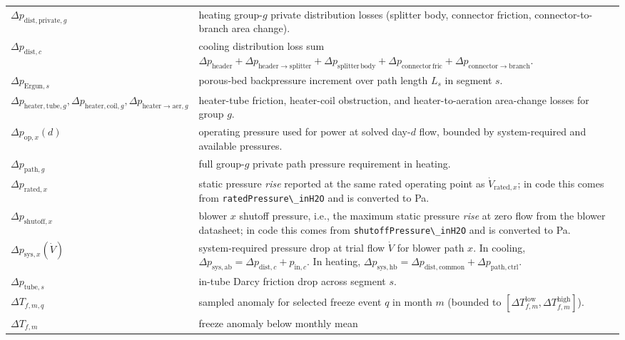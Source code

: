 {\begin{longtable}[]{@{}
  >{\raggedright\arraybackslash}p{}
  >{\raggedright\arraybackslash}p{}@{}}
\(\Delta p_{\mathrm{dist,private},g}\) & heating group-\(g\) private
distribution losses (splitter body, connector friction,
connector-to-branch area change). \\
\(\Delta p_{\mathrm{dist},c}\) & cooling distribution loss sum
\(\Delta p_{\mathrm{header}}+\Delta p_{\mathrm{header\rightarrow splitter}}+\Delta p_{\mathrm{splitter\,body}}+\Delta p_{\mathrm{connector\,fric}}+\Delta p_{\mathrm{connector\rightarrow branch}}\). \\
\(\Delta p_{\mathrm{Ergun},s}\) & porous-bed backpressure increment over
path length \(L_s\) in segment \(s\). \\
\(\Delta p_{\mathrm{heater,tube},g},\Delta p_{\mathrm{heater,coil},g},\Delta p_{\mathrm{heater\rightarrow aer},g}\)
& heater-tube friction, heater-coil obstruction, and heater-to-aeration
area-change losses for group \(g\). \\
\(\Delta p_{\mathrm{op},x}(d)\) & operating pressure used for power at
solved day-\(d\) flow, bounded by system-required and available
pressures. \\
\(\Delta p_{\mathrm{path},g}\) & full group-\(g\) private path pressure
requirement in heating. \\
\(\Delta p_{\mathrm{rated},x}\) & static pressure \emph{rise} reported
at the same rated operating point as \(\dot V_{\mathrm{rated},x}\); in
code this comes from \texttt{ratedPressure\textbackslash{}\_inH2O} and
is converted to Pa. \\
\(\Delta p_{\mathrm{shutoff},x}\) & blower \(x\) shutoff pressure, i.e.,
the maximum static pressure \emph{rise} at zero flow from the blower
datasheet; in code this comes from
\texttt{shutoffPressure\textbackslash{}\_inH2O} and is converted to
Pa. \\
\(\Delta p_{\mathrm{sys},x}(\dot V)\) & system-required pressure drop at
trial flow \(\dot V\) for blower path \(x\). In cooling,
\(\Delta p_{\mathrm{sys},\mathrm{ab}}=\Delta p_{\mathrm{dist},c}+p_{\mathrm{in},c}\).
In heating,
\(\Delta p_{\mathrm{sys},\mathrm{hb}}=\Delta p_{\mathrm{dist,common}}+\Delta p_{\mathrm{path,ctrl}}\). \\
\(\Delta p_{\mathrm{tube},s}\) & in-tube Darcy friction drop across
segment \(s\). \\
\(\Delta T_{f,m,q}\) & sampled anomaly for selected freeze event \(q\)
in month \(m\) (bounded to
\([\Delta T_{f,m}^{\mathrm{low}},\Delta T_{f,m}^{\mathrm{high}}]\)). \\
\(\Delta T_{f,m}\) & freeze anomaly below monthly mean \\

\end{longtable}}
